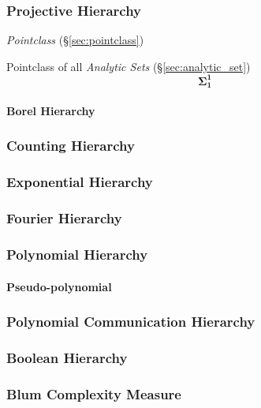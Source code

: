 \subsubsection{Projective Hierarchy}\label{sec:projective_hierarchy}

\emph{Pointclass} (\S\ref{sec:pointclass})

Pointclass of all \emph{Analytic Sets} (\S\ref{sec:analytic_set})
\[
  \mathbf{\Sigma^1_1}
\]

\paragraph{Borel Hierarchy}\hfill



\subsubsection{Counting Hierarchy}

\subsubsection{Exponential Hierarchy}

\subsubsection{Fourier Hierarchy}

\subsubsection{Polynomial Hierarchy}

\paragraph{Pseudo-polynomial}\label{sec:pseudo_polynomial}\hfill

\subsubsection{Polynomial Communication Hierarchy}

\subsubsection{Boolean Hierarchy}




\subsubsection{Blum Complexity Measure}

